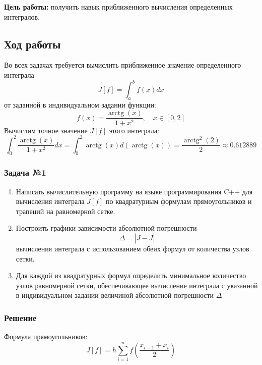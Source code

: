 \documentclass[a4paper, fontsize=14pt]{article}
\begin{document}

\textbf{Цель работы:} получить навык приближенного вычисления определенных интегралов.
\subsection*{{Ход работы}}
Во всех задачах требуется вычислить приближенное значение
определенного интеграла
\begin{equation*}
    J[f] = \int_a^b f(x) dx
\end{equation*}
от заданной в индивидуальном задании функции:
\begin{equation}
    \label{eq:individual_func}
    f(x) = \frac{\operatorname{arctg} (x)}{1+x^2}, \quad x \in [0, 2]
\end{equation}
Вычислим точное значение $J[f]$ этого интеграла:
\begin{equation}
    \int_0^2 \frac{\operatorname{arctg} (x)}{1+x^2} dx = \int_0^2 \operatorname{arctg} (x) d(\operatorname{arctg} (x)) = \frac{\operatorname{arctg}^2(2)}{2} \approx 0.612889
\end{equation}
\subsubsection*{Задача №1}
\begin{enumerate}
    \item Написать вычислительную программу на языке программирования C++
    для вычисления интеграла $J[f]$ по квадратурным формулам
    прямоугольников и трапеций на равномерной сетке.
    \item Построить графики зависимости абсолютной погрешности
    $$\Delta = |J - \overline{J}|$$
    вычисления интеграла с использованием обеих формул от количества
    узлов сетки.
    \item Для каждой из квадратурных формул определить минимальное
    количество узлов равномерной сетки, обеспечивающее вычисление
    интеграла с указанной в индивидуальном задании величиной
    абсолютной погрешности $\overline{\Delta}$
\end{enumerate}
\subsubsection*{Решение}
    Формула прямоугольников:
    \begin{equation*}
        J[f] = h \sum_{i=1}^n f\left(\frac{x_{i-1} + x_i}{2}\right)
    \end{equation*}
\end{document}
